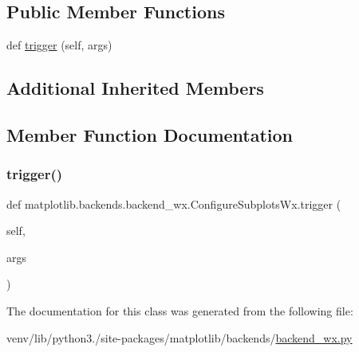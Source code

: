 \subsection*{Public Member Functions}
\begin{DoxyCompactItemize}
\item 
def \hyperlink{classmatplotlib_1_1backends_1_1backend__wx_1_1ConfigureSubplotsWx_ac22ba378161985f0a732cb2c2d34b323}{trigger} (self, args)
\end{DoxyCompactItemize}
\subsection*{Additional Inherited Members}


\subsection{Member Function Documentation}
\mbox{\label{classmatplotlib_1_1backends_1_1backend__wx_1_1ConfigureSubplotsWx_ac22ba378161985f0a732cb2c2d34b323}} 
\subsubsection{\texorpdfstring{trigger()}{trigger()}}
{\footnotesize\ttfamily def matplotlib.\+backends.\+backend\+\_\+wx.\+Configure\+Subplots\+Wx.\+trigger (\begin{DoxyParamCaption}\item[{}]{self,  }\item[{}]{args }\end{DoxyParamCaption})}



The documentation for this class was generated from the following file\+:\begin{DoxyCompactItemize}
\item 
venv/lib/python3./site-\/packages/matplotlib/backends/\hyperlink{backend__wx_8py}{backend\+\_\+wx.\+py}\end{DoxyCompactItemize}
